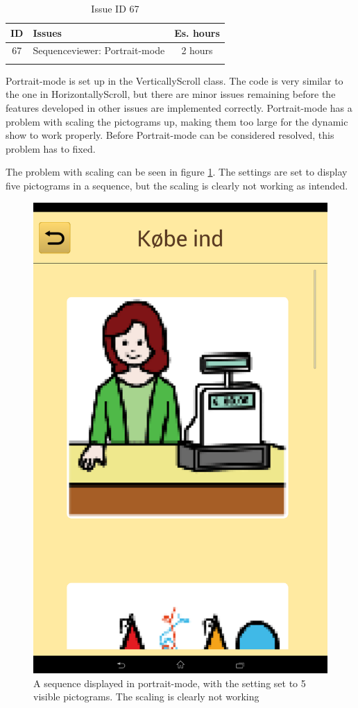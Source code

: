 \begin{longtable} { | c | p{12cm} | c | } 
\hline
	ID 	&	Issues	&		 Es. hours \\\hline
	 67	&	Sequenceviewer: Portrait-mode	&	2 hours \\\hline
\caption{Issue ID 67}
\label{tab:spr4_SVportrait}
\end{longtable}

Portrait-mode is set up in the VerticallyScroll class. The code is very similar to the one in HorizontallyScroll, but there are minor issues remaining before the features developed in other issues are implemented correctly. Portrait-mode has a problem with scaling the pictograms up, making them too large for the dynamic show to work properly. Before Portrait-mode can be considered resolved, this problem has to fixed.

The problem with scaling can be seen in figure \ref{fig:portraitscaling}. The settings are set to display five pictograms in a sequence, but the scaling is clearly not working as intended.

\begin{figure}[H]
	\centering
	\includegraphics[scale=0.12]{Pics/Sprint4/portraitscaling.png}
	\caption{A sequence displayed in portrait-mode, with the setting set to 5 visible pictograms. The scaling is clearly not working }
	\label{fig:portraitscaling}
\end{figure}